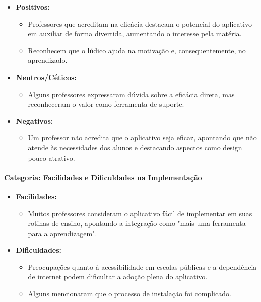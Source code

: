 \begin{itemize}
    \item \textbf{Positivos:}
    \begin{itemize}
        \item Professores que acreditam na eficácia destacam o potencial do aplicativo em auxiliar de forma divertida, aumentando o interesse pela matéria.
        \item Reconhecem que o lúdico ajuda na motivação e, consequentemente, no aprendizado.
    \end{itemize}
    \item \textbf{Neutros/Céticos:}
    \begin{itemize}
        \item Alguns professores expressaram dúvida sobre a eficácia direta, mas reconheceram o valor como ferramenta de suporte.
    \end{itemize}
    \item \textbf{Negativos:}
    \begin{itemize}
        \item Um professor não acredita que o aplicativo seja eficaz, apontando que não atende às necessidades dos alunos e destacando aspectos como design pouco atrativo.
    \end{itemize}
\end{itemize}

\paragraph{Categoria: Facilidades e Dificuldades na Implementação}

\begin{itemize}
    \item \textbf{Facilidades:}
    \begin{itemize}
        \item Muitos professores consideram o aplicativo fácil de implementar em suas rotinas de ensino, apontando a integração como "mais uma ferramenta para a aprendizagem".
    \end{itemize}
    \item \textbf{Dificuldades:}
    \begin{itemize}
        \item Preocupações quanto à acessibilidade em escolas públicas e a dependência de internet podem dificultar a adoção plena do aplicativo.
        \item Alguns mencionaram que o processo de instalação foi complicado.
    \end{itemize}
\end{itemize}

